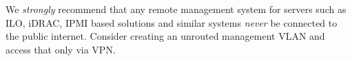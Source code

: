 

We \emph{strongly} recommend that any remote management system for servers such as ILO, iDRAC, IPMI based solutions and similar systems \emph{never} be connected to the public internet.
Consider creating an unrouted management VLAN and access that only via VPN.

